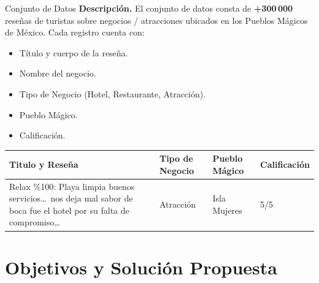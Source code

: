 \documentclass[10pt,aspectratio=169]{beamer}
\begin{document}
\begin{frame}{Conjunto de Datos}
	\textbf{Descripción.} El conjunto de datos consta de \textbf{+300\,000} reseñas de turistas
	sobre negocios / atracciones ubicados en los Pueblos Mágicos de México.
	Cada registro cuenta con:

	\begin{itemize}
		\item Título y cuerpo de la reseña.
		\item Nombre del negocio.
		\item Tipo de Negocio (Hotel, Restaurante, Atracción).
		\item Pueblo Mágico.
		\item Calificación.
	\end{itemize}

	\medskip
	\begin{table}[h]
		\centering
		\scriptsize
		\setlength{\tabcolsep}{5pt}
		\renewcommand{\arraystretch}{1.3}
		\begin{tabular}{|p{}|p{}|p{}|p{}|}
			\hline
			\rowcolor{accent!80}
			\color{white}\textbf{Titulo y Reseña}         &
			\color{white}\textbf{Tipo de Negocio}         &
			\color{white}\textbf{Pueblo Mágico}           &
			\color{white}\textbf{Calificación}                                             \\
			\hline
			Relax \%100: Playa limpia buenos servicios\ldots\ nos deja mal sabor de boca
			fue el hotel por su falta de compromiso\ldots & Atracción & Isla Mujeres & 5/5 \\
			\hline
		\end{tabular}
	\end{table}
\end{frame}

\section{Objetivos y Solución Propuesta}
\end{document}
